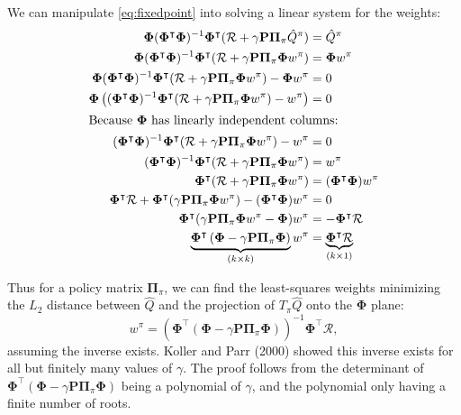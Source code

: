 \documentclass{article}
\newcommand{\parens}[1]{\left(#1\right)}
\begin{document}
We can manipulate \eqref{eq:fixedpoint} into solving a linear system for the weights:
\begin{align*}
	\mathbf{\Phi}(\mathbf{\Phi}^\intercal\mathbf{\Phi})^{-1}\mathbf{\Phi}^\intercal
		(\mathcal{R}+\gamma \mathbf{P}\mathbf{\Pi}_{\pi}\hat{Q}^{\pi})&=\hat{Q}^{\pi}\\	\mathbf{\Phi}(\mathbf{\Phi}^\intercal\mathbf{\Phi})^{-1}\mathbf{\Phi}^\intercal
				(\mathcal{R}+\gamma \mathbf{P}\mathbf{\Pi}_{\pi}\mathbf{\Phi}w^{\pi})&=\mathbf{\Phi}w^{\pi}\\
		\mathbf{\Phi}(\mathbf{\Phi}^\intercal\mathbf{\Phi})^{-1}\mathbf{\Phi}^\intercal
				(\mathcal{R}+\gamma \mathbf{P}\mathbf{\Pi}_{\pi}\mathbf{\Phi}w^{\pi})-\mathbf{\Phi}w^{\pi}&=0\\
		\mathbf{\Phi}\parens{(\mathbf{\Phi}^\intercal\mathbf{\Phi})^{-1}\mathbf{\Phi}^\intercal
						(\mathcal{R}+\gamma \mathbf{P}\mathbf{\Pi}_{\pi}\mathbf{\Phi}w^{\pi})-w^{\pi}}&=0\\
		\shortintertext{Because $\mathbf{\Phi}$ has linearly independent columns:}
		(\mathbf{\Phi}^\intercal\mathbf{\Phi})^{-1}\mathbf{\Phi}^\intercal
						(\mathcal{R}+\gamma \mathbf{P}\mathbf{\Pi}_{\pi}\mathbf{\Phi}w^{\pi})-w^{\pi}&=0\\
		(\mathbf{\Phi}^\intercal\mathbf{\Phi})^{-1}\mathbf{\Phi}^\intercal
						(\mathcal{R}+\gamma \mathbf{P}\mathbf{\Pi}_{\pi}\mathbf{\Phi}w^{\pi})&=w^{\pi}\\
		\mathbf{\Phi}^\intercal(\mathcal{R}+\gamma \mathbf{P}\mathbf{\Pi}_{\pi}\mathbf{\Phi}w^{\pi})&=(\mathbf{\Phi}^\intercal\mathbf{\Phi})w^{\pi}\\
		\mathbf{\Phi}^\intercal\mathcal{R}+\mathbf{\Phi}^\intercal(\gamma \mathbf{P}\mathbf{\Pi}_{\pi}\mathbf{\Phi}w^{\pi})-(\mathbf{\Phi}^\intercal\mathbf{\Phi})w^{\pi}&=0\\
		\mathbf{\Phi}^\intercal(\gamma \mathbf{P}\mathbf{\Pi}_{\pi}\mathbf{\Phi}w^{\pi}-\mathbf{\Phi})w^{\pi}&=
			-\mathbf{\Phi}^\intercal\mathcal{R}\\
		\underbrace{\mathbf{\Phi}^\intercal\parens{\mathbf{\Phi}-\gamma \mathbf{P}\mathbf{\Pi}_{\pi}\mathbf{\Phi}}
		}_{(k\times k)}
		w^{\pi}&=
		\underbrace{\mathbf{\Phi}^\intercal\mathcal{R}}_{(k\times 1)}\\
		\end{align*}

Thus for a policy matrix $\mathbf{\Pi}_{\pi}$, we can find the least-squares weights minimizing the $L_{2}$ distance between $\hat{Q}$ and the projection of  $T_{\pi}\hat{Q}$ onto the $\mathbf{\Phi}$ plane:
\[
	w^{\pi}=\parens{\mathbf{\Phi}^\intercal\parens{\mathbf{\Phi}-\gamma \mathbf{P}\mathbf{\Pi}_{\pi}\mathbf{\Phi}}}^{-1}\mathbf{\Phi}^\intercal\mathcal{R},
\]
assuming the inverse exists. 
Koller and Parr (2000) showed this inverse exists for all but finitely many values of $\gamma$.
The proof follows from the determinant of $	\mathbf{\Phi}^\intercal\parens{\mathbf{\Phi}-\gamma \mathbf{P}\mathbf{\Pi}_{\pi}\mathbf{\Phi}}$ being a polynomial of $\gamma$, and the polynomial only having a finite number of roots.
\end{document}
